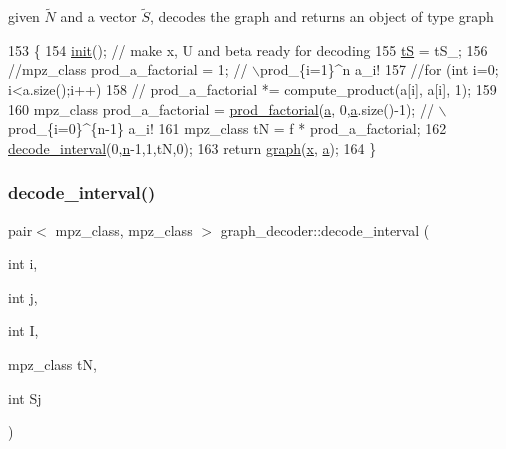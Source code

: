 given $\tilde{N}$ and a vector $\tilde{S}$, decodes the graph and returns an object of type graph 


\begin{DoxyCode}
153 \{
154   \hyperlink{classgraph__decoder_a97a9dcd5af21ece86fa91adcb41ca9cc}{init}(); \textcolor{comment}{// make x, U and beta ready for decoding }
155   \hyperlink{classgraph__decoder_ac466636b9b21122f4fa0246aa624978c}{tS} = tS\_;
156   \textcolor{comment}{//mpz\_class prod\_a\_factorial = 1; // \(\backslash\)prod\_\{i=1\}^n a\_i!}
157   \textcolor{comment}{//for (int i=0; i<a.size();i++)}
158   \textcolor{comment}{//  prod\_a\_factorial *= compute\_product(a[i], a[i], 1);}
159 
160   mpz\_class prod\_a\_factorial = \hyperlink{compression__helper_8cpp_a86d8a20e022dc06b23df3b08ac10b7d1}{prod\_factorial}(\hyperlink{classgraph__decoder_a9dd7c3c11b8a45a12cb7c3c2d2bfa2cc}{a}, 0,\hyperlink{classgraph__decoder_a9dd7c3c11b8a45a12cb7c3c2d2bfa2cc}{a}.size()-1); \textcolor{comment}{// \(\backslash\)prod\_\{i=0\}^\{n-1\} a\_i!}
161   mpz\_class tN = f * prod\_a\_factorial;
162   \hyperlink{classgraph__decoder_a2cb0bd279889a833d4c825e99eb72410}{decode\_interval}(0,\hyperlink{classgraph__decoder_a6bc1e72b2f7a913d14b789a6c2d92c1e}{n}-1,1,tN,0);
163   \textcolor{keywordflow}{return} \hyperlink{classgraph}{graph}(\hyperlink{classgraph__decoder_aa3f2776afe387668cf7f68109428e14e}{x}, \hyperlink{classgraph__decoder_a9dd7c3c11b8a45a12cb7c3c2d2bfa2cc}{a});
164 \}
\end{DoxyCode}
\mbox{\label{classgraph__decoder_a2cb0bd279889a833d4c825e99eb72410}} 
\subsubsection{\texorpdfstring{decode\+\_\+interval()}{decode\_interval()}}
{\footnotesize\ttfamily pair$<$ mpz\+\_\+class, mpz\+\_\+class $>$ graph\+\_\+decoder\+::decode\+\_\+interval (\begin{DoxyParamCaption}\item[{int}]{i,  }\item[{int}]{j,  }\item[{int}]{I,  }\item[{mpz\+\_\+class}]{tN,  }\item[{int}]{Sj }\end{DoxyParamCaption})}



